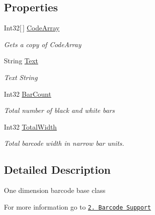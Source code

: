 \subsection*{Properties}
\begin{DoxyCompactItemize}
\item 
Int32\mbox{[}$\,$\mbox{]} \hyperlink{class_pdf_file_writer_1_1_barcode_a4e907e1c98d1b9fe5ca19b6221169a60}{Code\+Array}
\begin{DoxyCompactList}\small\item\em Gets a copy of Code\+Array \end{DoxyCompactList}\item 
String \hyperlink{class_pdf_file_writer_1_1_barcode_a1fe2157662e4a1b52264823a382fde3f}{Text}
\begin{DoxyCompactList}\small\item\em Text String \end{DoxyCompactList}\item 
Int32 \hyperlink{class_pdf_file_writer_1_1_barcode_a748eca8ece577f3e6608289d9a07987c}{Bar\+Count}
\begin{DoxyCompactList}\small\item\em Total number of black and white bars \end{DoxyCompactList}\item 
Int32 \hyperlink{class_pdf_file_writer_1_1_barcode_a7390066c4c5a6d1dc8e0fd93c9eb8214}{Total\+Width}
\begin{DoxyCompactList}\small\item\em Total barcode width in narrow bar units. \end{DoxyCompactList}\end{DoxyCompactItemize}


\subsection{Detailed Description}
One dimension barcode base class 

For more information go to \href{http://www.codeproject.com/Articles/570682/PDF-File-Writer-Csharp-Class-Library-Version#BarcodeSupport}{\tt 2. Barcode Support} 

